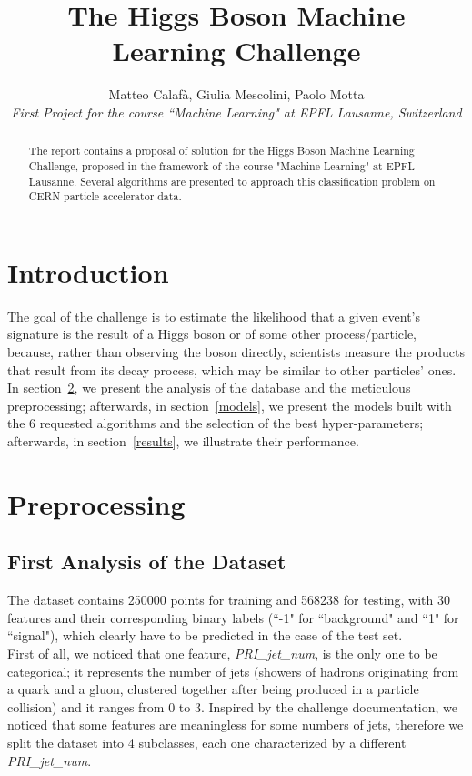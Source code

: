 \documentclass[10pt,conference,compsocconf]{IEEEtran}
\begin{document}
\title{The Higgs Boson Machine Learning Challenge}

\author{
  Matteo Calafà, Giulia Mescolini, Paolo Motta\\
  \textit{First Project for the course ``Machine Learning" at EPFL Lausanne, Switzerland}
}

\maketitle

\begin{abstract}
 The report contains a proposal of solution for the Higgs Boson Machine Learning Challenge, proposed in the framework of the course "Machine Learning" at EPFL Lausanne. Several algorithms are presented to approach this classification problem on CERN particle accelerator data.
\end{abstract}

\section{Introduction}

The goal of the challenge is to estimate the likelihood that a given event's signature is the result of a Higgs boson or of some other process/particle, because, rather than observing the boson directly, scientists measure the products that result from its decay process, which may be similar to other particles' ones. \\
In section~\ref{preprocessing}, we present the analysis of the database and the meticulous preprocessing; afterwards, in section~\ref{models}, we present the models built with the 6 requested algorithms and the selection of the best hyper-parameters; afterwards, in section~\ref{results}, we illustrate their performance.

\section{Preprocessing}
\label{preprocessing}

\subsection{First Analysis of the Dataset}
\label{categorical}
The dataset contains 250000 points for training and 568238 for testing, with 30 features and their corresponding binary labels (``-1" for ``background" and ``1" for ``signal"), which clearly have to be predicted in the case of the test set. \\
First of all, we noticed that one feature, \emph{PRI\_jet\_num}, is the only one to be categorical; it represents the number of jets (showers of hadrons originating from a quark and a gluon, clustered together after being produced in a particle collision) and it ranges from 0 to 3. Inspired by the challenge documentation, we noticed that some features are meaningless for some numbers of jets, therefore we split the dataset into 4 subclasses, each one characterized by a different \emph{PRI\_jet\_num}.
\end{document}
